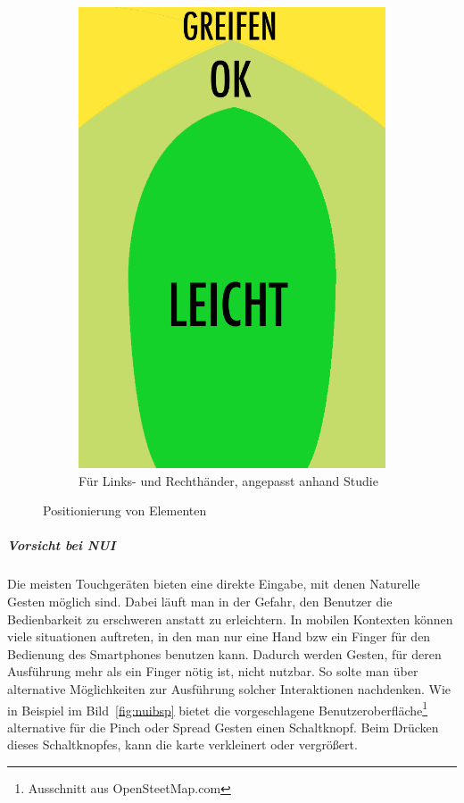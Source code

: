 \begin{figure}
\begin{subfigure}[b]{0.3\textwidth}
			\includegraphics[width=1\textwidth]{img/anordungDerElementeForAll.png}
			\caption{Für Links- und Rechthänder, angepasst anhand Studie \cite{Park:2010tu}}\label{fig:forallPositioning}
			
	\end{subfigure}
	\caption{Positionierung von Elementen}\label{fig:elementPos}
\end{figure}


\subparagraph{Vorsicht bei NUI} 
\label{subp:benutze_nui}

Die meisten Touchgeräten bieten eine direkte Eingabe, mit denen Naturelle Gesten möglich sind. Dabei läuft man in der Gefahr, den Benutzer die Bedienbarkeit zu erschweren anstatt zu erleichtern. In mobilen Kontexten können viele situationen auftreten, in den man nur eine Hand bzw ein Finger für den Bedienung des Smartphones benutzen kann. Dadurch werden Gesten, für deren Ausführung mehr als ein Finger nötig ist, nicht nutzbar. So solte man über alternative Möglichkeiten zur Ausführung solcher Interaktionen nachdenken. Wie in Beispiel im Bild~\ref{fig:nuibsp} bietet die vorgeschlagene Benutzeroberfläche\footnote{Ausschnitt aus OpenSteetMap.com} alternative für die Pinch oder Spread Gesten einen Schaltknopf. Beim Drücken dieses Schaltknopfes, kann die karte verkleinert oder vergrößert. 

